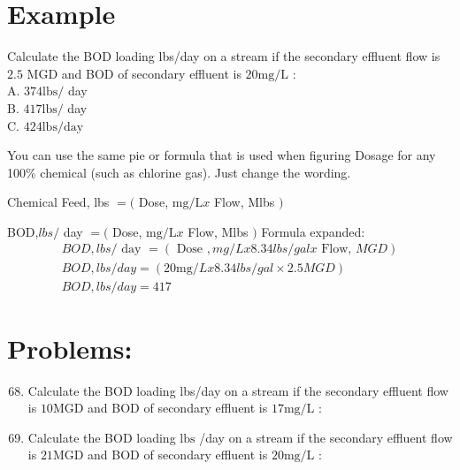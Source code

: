 \documentclass[10pt]{article}
\begin{document}
\section{Example}
Calculate the BOD loading lbs/day on a stream if the secondary effluent flow is $2.5$ MGD and BOD of secondary effluent is $20 \mathrm{mg} / \mathrm{L}$ :\\
A. $374 \mathrm{lbs} /$ day\\
B. $417 \mathrm{lbs} /$ day\\
C. $424 \mathrm{lbs} / \mathrm{day}$

You can use the same pie or formula that is used when figuring Dosage for any 100\% chemical (such as chlorine gas). Just change the wording.

Chemical Feed, lbs $=($ Dose, $\mathrm{mg} / \mathrm{L} x$ Flow, Mlbs $)$

BOD,$l b s /$ day $=($ Dose, $\mathrm{mg} / \mathrm{L} x$ Flow, Mlbs $)$ Formula expanded:
$$
\begin{gathered}
B O D, l b s / \text { day }=(\text { Dose }, m g / L x 8.34 l b s / g a l x \text { Flow, } M G D) \\
B O D, l b s / d a y=(20 \mathrm{mg} / L x 8.34 l b s / g a l \times 2.5 M G D) \\
B O D, l b s / d a y=417
\end{gathered}
$$

\section{Problems:}
\begin{enumerate}
  \setcounter{enumi}{67}
  \item Calculate the BOD loading lbs/day on a stream if the secondary effluent flow is $10 \mathrm{MGD}$ and BOD of secondary effluent is $17 \mathrm{mg} / \mathrm{L}$ :

  \item Calculate the BOD loading $\mathrm{lbs}$ /day on a stream if the secondary effluent flow is $21 \mathrm{MGD}$ and BOD of secondary effluent is $20 \mathrm{mg} / \mathrm{L}$ :

\end{enumerate}
\end{document}
